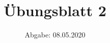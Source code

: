 

\subject{Computational Physics}
\title{Übungsblatt 2}
\date{%
  Abgabe: 08.05.2020
}



\maketitle
\thispagestyle{empty}
\newpage









